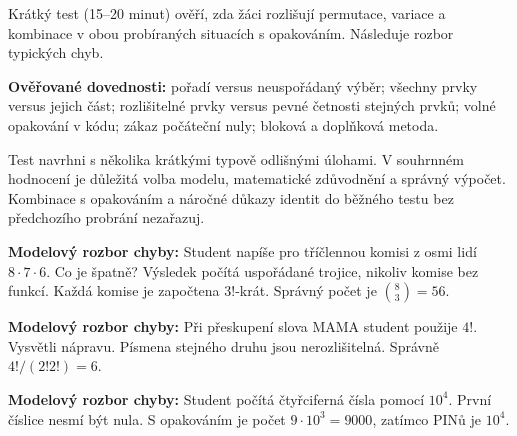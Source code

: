 \documentclass[11pt,a4paper]{article}
\begin{document}

Krátký test (15--20 minut) ověří, zda žáci rozlišují permutace, variace a kombinace v obou probíraných situacích s opakováním. Následuje rozbor typických chyb.



\begin{definiceBox}
\textbf{Ověřované dovednosti:} pořadí versus neuspořádaný výběr; všechny prvky versus jejich část; rozlišitelné prvky versus pevné četnosti stejných prvků; volné opakování v kódu; zákaz počáteční nuly; bloková a doplňková metoda.
\end{definiceBox}
Test navrhni s několika krátkými typově odlišnými úlohami. V souhrnném hodnocení je důležitá volba modelu, matematické zdůvodnění a správný výpočet. Kombinace s opakováním a náročné důkazy identit do běžného testu bez předchozího probrání nezařazuj.


\begin{prikladReseniBox}[title={Příklad 1}]
\textbf{Modelový rozbor chyby:} Student napíše pro tříčlennou komisi z osmi lidí $8\cdot7\cdot6$. Co je špatně?
\tcblower
Výsledek počítá uspořádané trojice, nikoliv komise bez funkcí. Každá komise je započtena $3!$-krát. Správný počet je $\binom83=56$.
\end{prikladReseniBox}



\begin{prikladReseniBox}[title={Příklad 2}]
\textbf{Modelový rozbor chyby:} Při přeskupení slova MAMA student použije $4!$. Vysvětli nápravu.
\tcblower
Písmena stejného druhu jsou nerozlišitelná. Správně $4!/(2!2!)=6$.
\end{prikladReseniBox}



\begin{prikladReseniBox}[title={Příklad 3}]
\textbf{Modelový rozbor chyby:} Student počítá čtyřciferná čísla pomocí $10^4$.
\tcblower
První číslice nesmí být nula. S opakováním je počet $9\cdot10^3=9000$, zatímco PINů je $10^4$.
\end{prikladReseniBox}



\end{document}
